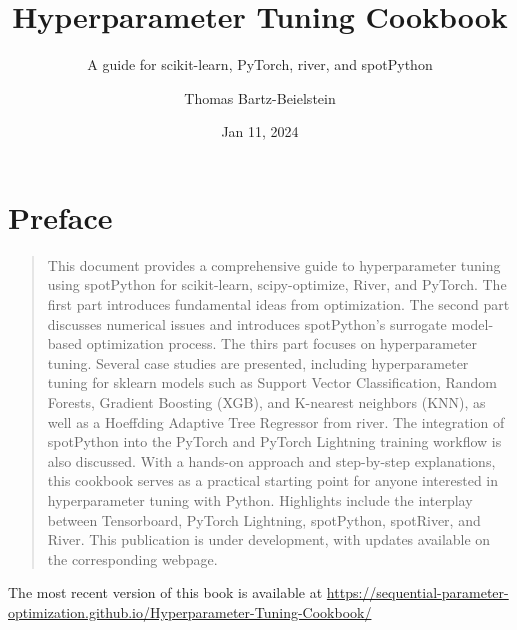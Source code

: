\documentclass[
  letterpaper,
  DIV=11,
  numbers=noendperiod]{scrreprt}
\title{Hyperparameter Tuning Cookbook}
\subtitle{A guide for scikit-learn, PyTorch, river, and spotPython}
\author{Thomas Bartz-Beielstein}
\date{Jan 11, 2024}
\renewcommand*\contentsname{Table of contents}
\newcommand\contentsname{Table of contents}
\begin{document}
\maketitle

\renewcommand*\contentsname{Table of contents}
{
\hypersetup{linkcolor=}
\setcounter{tocdepth}{2}
\tableofcontents
}

\chapter*{Preface}\label{preface}


\begin{quote}
This document provides a comprehensive guide to hyperparameter tuning
using spotPython for scikit-learn, scipy-optimize, River, and PyTorch.
The first part introduces fundamental ideas from optimization. The
second part discusses numerical issues and introduces spotPython's
surrogate model-based optimization process. The thirs part focuses on
hyperparameter tuning. Several case studies are presented, including
hyperparameter tuning for sklearn models such as Support Vector
Classification, Random Forests, Gradient Boosting (XGB), and K-nearest
neighbors (KNN), as well as a Hoeffding Adaptive Tree Regressor from
river. The integration of spotPython into the PyTorch and PyTorch
Lightning training workflow is also discussed. With a hands-on approach
and step-by-step explanations, this cookbook serves as a practical
starting point for anyone interested in hyperparameter tuning with
Python. Highlights include the interplay between Tensorboard, PyTorch
Lightning, spotPython, spotRiver, and River. This publication is under
development, with updates available on the corresponding webpage.
\end{quote}

\begin{tcolorbox}[enhanced jigsaw, left=2mm, opacitybacktitle=0.6, leftrule=.75mm, toptitle=1mm, opacityback=0, colback=white, rightrule=.15mm, colframe=quarto-callout-important-color-frame, title=\textcolor{quarto-callout-important-color}{\faExclamation}\hspace{0.5em}{Important: This book is still under development.}, toprule=.15mm, coltitle=black, bottomrule=.15mm, bottomtitle=1mm, colbacktitle=quarto-callout-important-color!10!white, titlerule=0mm, breakable, arc=.35mm]

The most recent version of this book is available at
\url{https://sequential-parameter-optimization.github.io/Hyperparameter-Tuning-Cookbook/}

\end{tcolorbox}
\end{document}
